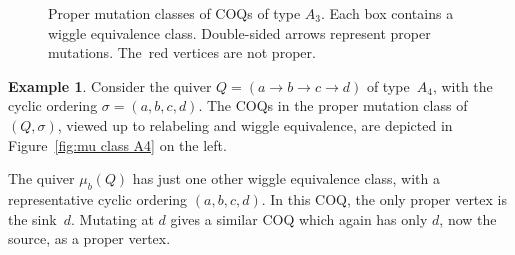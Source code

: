 \documentclass[11pt, letterpaper]{amsart}
\theoremstyle{definition}
\newtheorem{example}[theorem]{Example}
\numberwithin{equation}{section}
\begin{document}
\begin{figure}[ht]
{\begin{tikzpicture}
\end{tikzpicture}
}
\vspace{3pt}
\caption{Proper mutation classes of COQs of type $A_3$. %
Each box contains a wiggle equivalence class. 
Double-sided arrows represent proper mutations.
The~red vertices are not proper.}
\label{fig:mu class A3 abstracted}
\end{figure}

\vspace{-3pt}

\begin{example}
\label{eg:A4}
Consider the quiver $Q = (a \rightarrow b \rightarrow c \rightarrow d)$ of type~$A_4$, 
with the cyclic ordering $\sigma=(a,b,c,d)$.
The COQs in the proper mutation class of $(Q,\sigma)$, viewed up to relabeling  
and wiggle equivalence, are depicted in Figure~\ref{fig:mu class A4} on the left.

The quiver $\mu_b(Q)$ has just one other wiggle equivalence class, 
with a representative cyclic ordering $(a,b,c,d)$. In this COQ, the only proper vertex is the sink~$d$. 
Mutating at $d$ gives a similar COQ which again has only $d$, now the source, as a proper vertex. 
\end{example}
\end{document}

